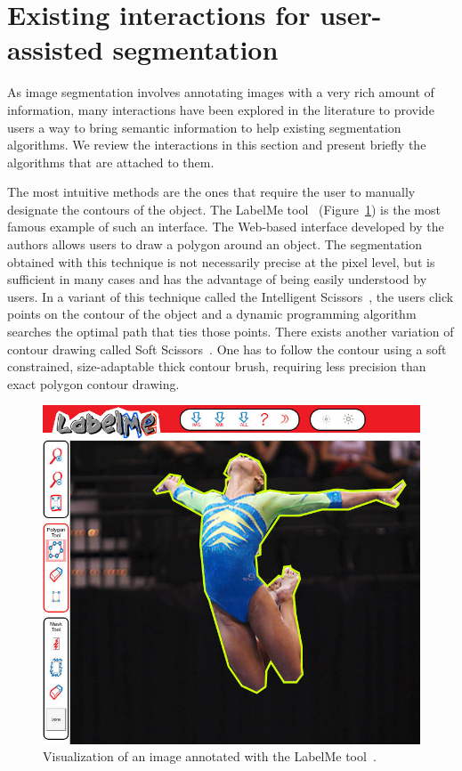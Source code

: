 \section{Existing interactions for user-assisted segmentation}

As image segmentation involves annotating images
with a very rich amount of information,
many interactions have been explored in the literature
to provide users a way to bring semantic information
to help existing segmentation algorithms.
We review the interactions in this section
and present briefly the algorithms that are attached to them.


The most intuitive methods are the ones that require
the user to manually designate the contours of the object.
The LabelMe tool~\cite{russell2008labelme}
(Figure~\ref{fig:labelme}) is the most famous example
of such an interface.
The Web-based interface developed by the authors
allows users to draw a polygon around an object.
The segmentation obtained with this technique
is not necessarily precise at the pixel level,
but is sufficient in many cases and has the advantage of being
easily understood by users.
In a variant of this technique called
the Intelligent Scissors~\cite{mortensen1995intelligent},
the users click points on the contour of the object and a dynamic
programming algorithm searches the optimal path that ties those points.
There exists another variation of contour drawing called
Soft Scissors~\cite{wang2007soft}.
One has to follow the contour using a soft constrained,
size-adaptable thick contour brush,
requiring less precision than exact polygon contour drawing.


\begin{figure}[ht]
\centering
\includegraphics[width=0.8\columnwidth]{assets/img/LabelMe.jpg}
\caption{Visualization of an image annotated with the LabelMe tool~\cite{russell2008labelme}.}%
\label{fig:labelme}
\end{figure}


